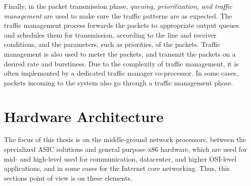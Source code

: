 Finally, in the packet transmission phase, \emph{queuing, prioritization, and traffic management} are used to make sure the traffic patterns are as expected. The traffic management process forwards the packets to appropriate output queues and schedules them for transmission, according to the line and receiver conditions, and the parameters, such as priorities, of the packets. Traffic management is also used to meter the packets, and transmit the packets on a desired rate and burstiness. Due to the complexity of traffic management, it is often implemented by a dedicated traffic manager co-processor. In some cases, packets incoming to the system also go through a traffic management phase.~\cite{Giladi:2008:Network}




\section{Hardware Architecture}
\label{sec:hardware-architecture}

The focus of this thesis is on the middle-ground network processors, between the specialized ASIC solutions and general purpose x86 hardware, which are used for mid- and high-level used for communication, datacenter, and higher OSI-level applications, and in some cases for the Internet core networking. Thus, this sections point of view is on these elements.

